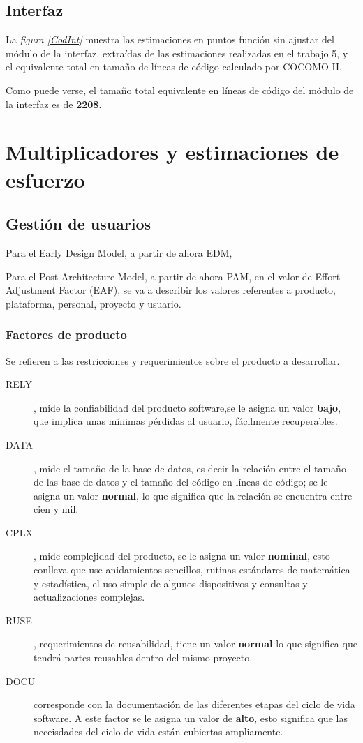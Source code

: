 \documentclass[11pt,a4paper,spanish,twoside]{book}
\begin{document}
\section{Interfaz}
La \emph{figura \ref{CodInt}} muestra las estimaciones en puntos función sin
ajustar del módulo de la interfaz, extraídas de las estimaciones realizadas en
el trabajo 5, y el equivalente total en tamaño de líneas de código calculado
por COCOMO II.


Como puede verse, el tamaño total equivalente en líneas de código del módulo
de la interfaz es de \textbf{2208}.

\chapter{Multiplicadores y estimaciones de esfuerzo}
\section{Gestión de usuarios}
Para el Early Design Model, a partir de ahora EDM, 

Para el Post Architecture Model, a partir de ahora PAM, en el valor de Effort
Adjustment Factor (EAF), se va a describir los valores referentes a producto,
plataforma, personal, proyecto y usuario. 
\subsection{Factores de producto}
Se refieren a las restricciones y requerimientos sobre el producto a
desarrollar.
\begin{description}
\item [RELY], mide la confiabilidad del producto software,se le
asigna un valor \textbf{bajo}, que implica unas mínimas pérdidas al usuario,
fácilmente recuperables. 

\item[DATA], mide el tamaño de la base de datos, es decir la
relación entre el tamaño de las base de datos y el tamaño del código en
líneas de código; se le asigna un valor \textbf{normal}, lo que significa que la
relación se encuentra entre cien y mil.

\item[CPLX], mide complejidad del producto, se le asigna un
valor \textbf{nominal}, esto conlleva que use anidamientos sencillos, rutinas
estándares de matemática y estadística, el uso simple de algunos dispositivos
y consultas y actualizaciones complejas.

\item [RUSE], requerimientos de reusabilidad, tiene un valor
\textbf{normal} lo que significa que tendrá partes reusables dentro del mismo
proyecto. 

\item[DOCU] corresponde con la documentación de las diferentes etapas del
ciclo de vida software. A este factor se le asigna un valor de \textbf{alto},
esto significa que las neceisdades del ciclo de vida están cubiertas
ampliamente. 

\end{description}
\end{document}
